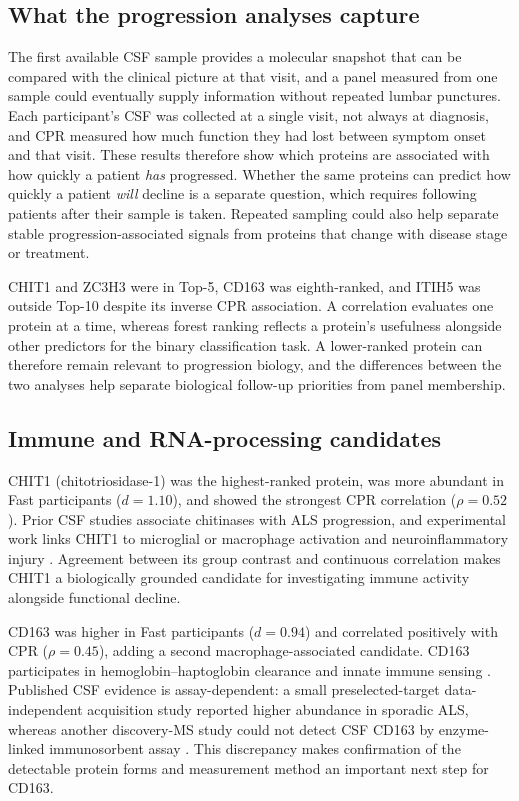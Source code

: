 \documentclass[11pt,letterpaper]{article}
\begin{document}
\subsection{What the progression analyses capture}

The first available CSF sample provides a molecular snapshot that can be compared with the clinical picture at that visit, and a panel measured from one sample could eventually supply information without repeated lumbar punctures. Each participant's CSF was collected at a single visit, not always at diagnosis, and CPR measured how much function they had lost between symptom onset and that visit. These results therefore show which proteins are associated with how quickly a patient \emph{has} progressed. Whether the same proteins can predict how quickly a patient \emph{will} decline is a separate question, which requires following patients after their sample is taken. Repeated sampling could also help separate stable progression-associated signals from proteins that change with disease stage or treatment.

CHIT1 and ZC3H3 were in Top-5, CD163 was eighth-ranked, and ITIH5 was outside Top-10 despite its inverse CPR association. A correlation evaluates one protein at a time, whereas forest ranking reflects a protein's usefulness alongside other predictors for the binary classification task. A lower-ranked protein can therefore remain relevant to progression biology, and the differences between the two analyses help separate biological follow-up priorities from panel membership.

\subsection{Immune and RNA-processing candidates}

CHIT1 (chitotriosidase-1) was the highest-ranked protein, was more abundant in Fast participants ($d = 1.10$), and showed the strongest CPR correlation ($\rho = 0.52$). Prior CSF studies associate chitinases with ALS progression, and experimental work links CHIT1 to microglial or macrophage activation and neuroinflammatory injury \citep{thompson2019,varghese2020,steinacker2021}. Agreement between its group contrast and continuous correlation makes CHIT1 a biologically grounded candidate for investigating immune activity alongside functional decline.

CD163 was higher in Fast participants ($d = 0.94$) and correlated positively with CPR ($\rho = 0.45$), adding a second macrophage-associated candidate. CD163 participates in hemoglobin--haptoglobin clearance and innate immune sensing \citep{fabriek2009}. Published CSF evidence is assay-dependent: a small preselected-target data-independent acquisition study reported higher abundance in sporadic ALS, whereas another discovery-MS study could not detect CSF CD163 by enzyme-linked immunosorbent assay \citep{dellar2025,deluna2023}. %
This discrepancy makes confirmation of the detectable protein forms and measurement method an important next step for CD163.
\end{document}
